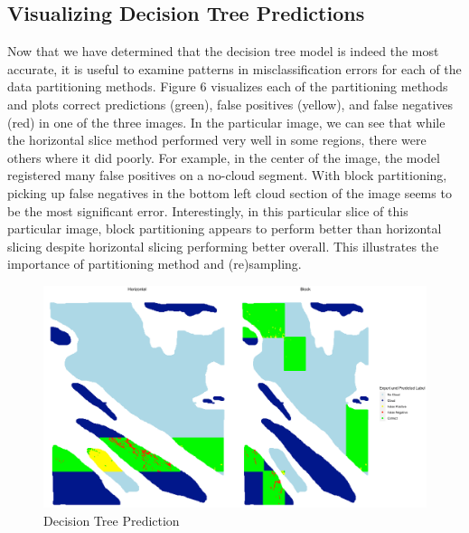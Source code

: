\documentclass[12pt]{article}
\begin{document}
\subsection{Visualizing Decision Tree Predictions}
Now that we have determined that the decision tree model is indeed the most accurate, it is useful to examine patterns in misclassification errors for each of the data partitioning methods. Figure 6 visualizes each of the partitioning methods and plots correct predictions (green), false positives (yellow), and false negatives (red) in one of the three images. In the particular image, we can see that while the horizontal slice method performed very well in some regions, there were others where it did poorly. For example, in the center of the image, the model registered many false positives on a no-cloud segment. With block partitioning, picking up false negatives in the bottom left cloud section of the image seems to be the most significant error. Interestingly, in this particular slice of this particular image, block partitioning appears to perform better than horizontal slicing despite horizontal slicing performing better overall. This illustrates the importance of partitioning method and (re)sampling. 
\begin{figure}[htp!]
\caption{Decision Tree Prediction}
\includegraphics[width=15cm]{Fig6.png}
\centering
\end{figure}
\newline
\newline
\end{document}
